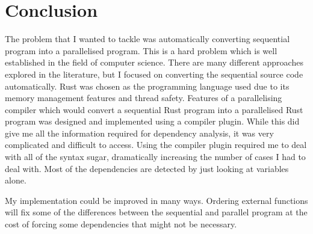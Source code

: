 \chapter{Conclusion}

The problem that I wanted to tackle was automatically converting sequential program into a parallelised program. This is a hard problem which is well established in the field of computer science. There are many different approaches explored in the literature, but I focused on converting the sequential source code automatically. Rust was chosen as the programming language used due to its memory management features and thread safety. Features of a parallelising compiler which would convert a sequential Rust program into a parallelised Rust program was designed and implemented using a compiler plugin. While this did give me all the information required for dependency analysis, it was very complicated and difficult to access. Using the compiler plugin required me to deal with all of the syntax sugar, dramatically increasing the number of cases I had to deal with. Most of the dependencies are detected by just looking at variables alone.



My implementation could be improved in many ways. Ordering external functions will fix some of the differences between the sequential and parallel program at the cost of forcing some dependencies that might not be necessary.



